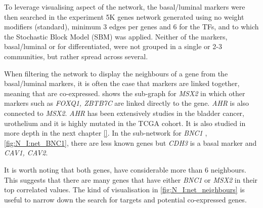 To leverage visualising aspect of the network, the basal/luminal markers were then searched in the experiment 5K genes network generated using no weight modifiers (standard), minimum 3 edges per genes and 6 for the TFs, and to which the Stochastic Block Model (SBM) was applied. Neither of the markers, basal/luminal or for differentiated, were not grouped in a single or 2-3 communities, but rather spread across several.

When filtering the network to display the neighbours of a  gene from the basal/luminal markers, it is often the case that markers are linked together, meaning that are co-expressed.  shows the sub-graph for \textit{MSX2} in which other markers such as \textit{FOXQ1, ZBTB7C} are linked directly to the gene. \textit{AHR} is also connected to \textit{MSX2}. \textit{AHR} has been extensively studies in the bladder cancer, urothelium and it is highly mutated in the TCGA cohort. It is also studied in more depth in the next chapter \ref{}. In the sub-network for \textit{BNC1} , \cref{fig:N_I:net_BNC1}, there are less known genes but \textit{CDH3} is a basal marker \citet{Dadhania2016-cb} and \textit{CAV1, CAV2}. 

It is worth noting that both genes, have considerable more than 6 neighbours. This suggests that there are many genes that have either \textit{BNC1} or \textit{MSX2} in their top correlated values. The kind of visualisation in \cref{fig:N_I:net_neighbours} is useful to narrow down the search for targets and potential co-expressed genes.


